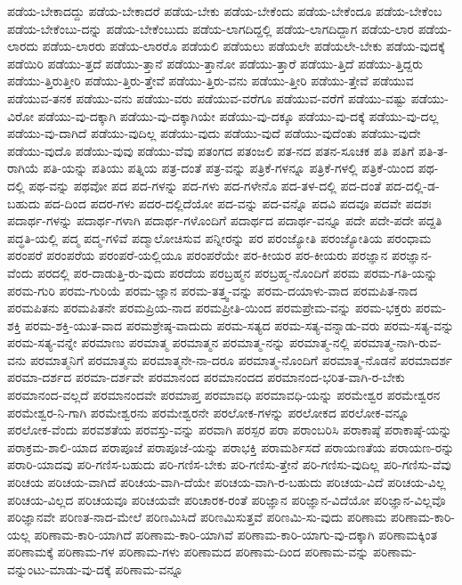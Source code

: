 {ಪಡೆಯ-ಬೇಕಾದದ್ದು
ಪಡೆಯ-ಬೇಕಾದರೆ
ಪಡೆಯ-ಬೇಕು
ಪಡೆಯ-ಬೇಕೆಂದು
ಪಡೆಯ-ಬೇಕೆಂದೂ
ಪಡೆಯ-ಬೇಕೆಂಬ
ಪಡೆಯ-ಬೇಕೆಂಬು-ದನ್ನು
ಪಡೆಯ-ಬೇಕೆಂಬುದು
ಪಡೆಯ-ಲಾಗದಿದ್ದಲ್ಲಿ
ಪಡೆಯ-ಲಾಗದಿದ್ದಾಗ
ಪಡೆಯ-ಲಾರ
ಪಡೆಯ-ಲಾರದು
ಪಡೆಯ-ಲಾರರು
ಪಡೆಯ-ಲಾರರೊ
ಪಡೆಯಲಿ
ಪಡೆಯಲು
ಪಡೆಯಲೇ
ಪಡೆಯಲೇ-ಬೇಕು
ಪಡೆಯ-ವುದಕ್ಕೆ
ಪಡೆಯಿರಿ
ಪಡೆಯು-ತ್ತದೆ
ಪಡೆಯು-ತ್ತಾನೆ
ಪಡೆಯು-ತ್ತಾನೋ
ಪಡೆಯು-ತ್ತಾರೆ
ಪಡೆಯು-ತ್ತಿದೆ
ಪಡೆಯು-ತ್ತಿದ್ದರು
ಪಡೆಯು-ತ್ತಿರುತ್ತೀರಿ
ಪಡೆಯು-ತ್ತಿರು-ತ್ತೇವೆ
ಪಡೆಯು-ತ್ತಿರು-ವನು
ಪಡೆಯು-ತ್ತೀರಿ
ಪಡೆಯು-ತ್ತೇವೆ
ಪಡೆಯುವ
ಪಡೆಯುವ-ತನಕ
ಪಡೆಯು-ವನು
ಪಡೆಯು-ವರು
ಪಡೆಯುವ-ವರೆಗೂ
ಪಡೆಯುವ-ವರೆಗೆ
ಪಡೆಯು-ವಷ್ಟು
ಪಡೆಯು-ವಿರೋ
ಪಡೆಯು-ವು-ದಕ್ಕಾಗಿ
ಪಡೆಯು-ವು-ದಕ್ಕಾಗಿಯೇ
ಪಡೆಯು-ವು-ದಕ್ಕೂ
ಪಡೆಯು-ವು-ದಕ್ಕೆ
ಪಡೆಯು-ವು-ದಲ್ಲ
ಪಡೆಯು-ವು-ದಾಗಿದೆ
ಪಡೆಯು-ವುದಿಲ್ಲ
ಪಡೆಯು-ವುದು
ಪಡೆಯು-ವುದೆ
ಪಡೆಯು-ವುದೆಂತು
ಪಡೆಯು-ವುದೇ
ಪಡೆಯು-ವುದೊ
ಪಡೆಯು-ವುವು
ಪಡೆಯು-ವೆವು
ಪತಂಗದ
ಪತಂಜಲಿ
ಪತ-ನದ
ಪತನ-ಸೂಚಕ
ಪತಿ
ಪತಿಗೆ
ಪತಿ-ತ-ರಾಗಿಯೆ
ಪತಿ-ಯನ್ನು
ಪತಿಯು
ಪತ್ನಿಯ
ಪತ್ರ-ದಂತೆ
ಪತ್ರ-ವನ್ನು
ಪತ್ರಿಕೆ-ಗಳನ್ನೂ
ಪತ್ರಿಕೆ-ಗಳಲ್ಲಿ
ಪತ್ರಿಕೆ-ಯಿಂದ
ಪಥ-ದಲ್ಲಿ
ಪಥ-ವನ್ನು
ಪಥವೋ
ಪದ
ಪದ-ಗಳನ್ನು
ಪದ-ಗಳು
ಪದ-ಗಳೇನೊ
ಪದ-ತಳ-ದಲ್ಲಿ
ಪದ-ದಂತೆ
ಪದ-ದಲ್ಲಿ-ಡ-ಬಹುದು
ಪದ-ದಿಂದ
ಪದರ-ಗಳು
ಪದರ-ದಲ್ಲಿದೆಯೋ
ಪದ-ವನ್ನು
ಪದ-ವನ್ನೊ
ಪದವಿ
ಪದವೂ
ಪದವೇ
ಪದಶಃ
ಪದಾರ್ಥ-ಗಳನ್ನು
ಪದಾರ್ಥ-ಗಳಾಗಿ
ಪದಾರ್ಥ-ಗಳೊಂದಿಗೆ
ಪದಾರ್ಥದ
ಪದಾರ್ಥ-ವನ್ನೂ
ಪದೇ
ಪದೇ-ಪದೇ
ಪದ್ದತಿ
ಪದ್ಧತಿ-ಯಲ್ಲಿ
ಪದ್ಮ
ಪದ್ಮ-ಗಳಿವೆ
ಪದ್ಮಾಲೋಚಿಸುವ
ಪನ್ನೀರನ್ನು
ಪರ
ಪರಂಜ್ಯೋತಿ
ಪರಂಜ್ಯೋತಿಯ
ಪರಂಧಾಮ
ಪರಂಪರೆ
ಪರಂಪರೆಯ
ಪರಂಪರೆ-ಯಲ್ಲಿಯೂ
ಪರಂಪರೆಯೇ
ಪರ-ಕೀಯರ
ಪರ-ಕೀಯರು
ಪರಜ್ಞಾನ
ಪರಜ್ಞಾನ-ವೆಂದು
ಪರದಲ್ಲಿ
ಪರ-ದಾಡುತ್ತಿ-ರು-ವುದು
ಪರದೆಯ
ಪರಬ್ರಹ್ಮನ
ಪರಬ್ರಹ್ಮ-ನೊಂದಿಗೆ
ಪರಮ
ಪರಮ-ಗತಿ-ಯನ್ನು
ಪರಮ-ಗುರಿ
ಪರಮ-ಗುರಿಯೆ
ಪರಮ-ಜ್ಞಾನ
ಪರಮ-ತತ್ತ್ವ-ವನ್ನು
ಪರಮ-ದಯಾಳು-ವಾದ
ಪರಮಪಿತ-ನಾದ
ಪರಮಪಿತನು
ಪರಮಪಿತನೇ
ಪರಮಪ್ರಿಯ-ನಾದ
ಪರಮಪ್ರೀತಿ-ಯಿಂದ
ಪರಮಪ್ರೇಮ-ವನ್ನು
ಪರಮ-ಭಕ್ತರು
ಪರಮ-ಶಕ್ತಿ
ಪರಮ-ಶಕ್ತಿ-ಯುತ-ವಾದ
ಪರಮಶ್ರೇಷ್ಠ-ವಾದುದು
ಪರಮ-ಸತ್ಯದ
ಪರಮ-ಸತ್ಯ-ವನ್ನಾಡು-ವರು
ಪರಮ-ಸತ್ಯ-ವನ್ನು
ಪರಮ-ಸತ್ಯ-ವನ್ನೇ
ಪರಮಾಣು
ಪರಮಾತ್ಮ
ಪರಮಾತ್ಮನ
ಪರಮಾತ್ಮ-ನನ್ನು
ಪರಮಾತ್ಮ-ನಲ್ಲಿ
ಪರಮಾತ್ಮ-ನಾಗಿ-ರುವ-ವನು
ಪರಮಾತ್ಮನಿಗೆ
ಪರಮಾತ್ಮನು
ಪರಮಾತ್ಮನೇ-ನಾ-ದರೂ
ಪರಮಾತ್ಮ-ನೊಂದಿಗೆ
ಪರಮಾತ್ಮ-ನೊಡನೆ
ಪರಮಾದರ್ಶ
ಪರಮಾ-ದರ್ಶದ
ಪರಮಾ-ದರ್ಶವೇ
ಪರಮಾನಂದ
ಪರಮಾನಂದದ
ಪರಮಾನಂದ-ಭರಿತ-ವಾಗಿ-ರ-ಬೇಕು
ಪರಮಾನಂದ-ವಲ್ಲದೆ
ಪರಮಾನಂದವೇ
ಪರಮಾಪ್ತ
ಪರಮಾವಧಿ
ಪರಮಾವಧಿ-ಯನ್ನು
ಪರಮೇಶ್ವರ
ಪರಮೇಶ್ವರನ
ಪರಮೇಶ್ವರ-ನಿ-ಗಾಗಿ
ಪರಮೇಶ್ವರನು
ಪರಮೇಶ್ವರನೇ
ಪರಲೋಕ-ಗಳನ್ನು
ಪರಲೋಕದ
ಪರಲೋಕ-ವನ್ನೂ
ಪರಲೋಕ-ವೆಂದು
ಪರವಶತೆಯ
ಪರವಸ್ತು-ವನ್ನು
ಪರವಾಗಿ
ಪರಸ್ಪರ
ಪರಾ
ಪರಾಂಬರಿಸಿ
ಪರಾಕಾಷ್ಠೆ
ಪರಾಕಾಷ್ಠೆ-ಯನ್ನು
ಪರಾಕ್ರಮ-ಶಾಲಿ-ಯಾದ
ಪರಾಪೂಜೆ
ಪರಾಪೂಜೆ-ಯನ್ನು
ಪರಾಭಕ್ತಿ
ಪರಾಮರ್ಶಿಸದೆ
ಪರಾಯಣತೆಯ
ಪರಾಯಣ-ರನ್ನು
ಪರಾರಿ-ಯಾದವು
ಪರಿ-ಗಣಿಸ-ಬಹುದು
ಪರಿ-ಗಣಿಸ-ಬೇಕು
ಪರಿ-ಗಣಿಸು-ತ್ತೇನೆ
ಪರಿ-ಗಣಿಸು-ವುದಿಲ್ಲ
ಪರಿ-ಗಣಿಸು-ವೆವು
ಪರಿಚಯ
ಪರಿಚಯ-ವಾಗಿದೆ
ಪರಿಚಯ-ವಾಗಿ-ದೆಯೇ
ಪರಿಚಯ-ವಾಗಿ-ರ-ಬಹುದು
ಪರಿಚಯ-ವಿದೆ
ಪರಿಚಯ-ವಿಲ್ಲ
ಪರಿಚಯ-ವಿಲ್ಲದ
ಪರಿಚಯವೂ
ಪರಿಚಯವೇ
ಪರಿಚಾರಕ-ರಂತೆ
ಪರಿಜ್ಞಾನ
ಪರಿಜ್ಞಾನ-ವಿದೆಯೋ
ಪರಿಜ್ಞಾನ-ವಿಲ್ಲವೊ
ಪರಿಜ್ಞಾನವೇ
ಪರಿಣತ-ನಾದ-ಮೇಲೆ
ಪರಿಣಮಿಸಿದೆ
ಪರಿಣಮಿಸುತ್ತವೆ
ಪರಿಣಮಿ-ಸು-ವುದು
ಪರಿಣಾಮ
ಪರಿಣಾಮ-ಕಾರಿ-ಯಲ್ಲ
ಪರಿಣಾಮ-ಕಾರಿ-ಯಾಗಿದೆ
ಪರಿಣಾಮ-ಕಾರಿ-ಯಾಗಿವೆ
ಪರಿಣಾಮ-ಕಾರಿ-ಯಾಗು-ವು-ದಕ್ಕಾಗಿ
ಪರಿಣಾಮಕ್ಕಿಂತ
ಪರಿಣಾಮಕ್ಕೆ
ಪರಿಣಾಮ-ಗಳ
ಪರಿಣಾಮ-ಗಳು
ಪರಿಣಾಮದ
ಪರಿಣಾಮ-ದಿಂದ
ಪರಿಣಾಮ-ವನ್ನು
ಪರಿಣಾಮ-ವನ್ನುಂಟು-ಮಾಡು-ವು-ದಕ್ಕೆ
ಪರಿಣಾಮ-ವನ್ನೂ
}
